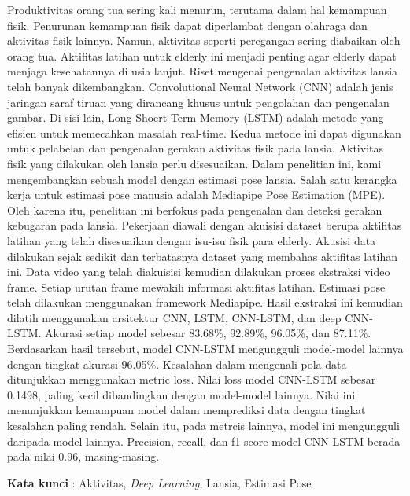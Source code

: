 \begin{spacing}{1}
    
    Produktivitas orang tua sering kali menurun, terutama dalam hal kemampuan fisik. Penurunan kemampuan fisik dapat diperlambat dengan olahraga dan aktivitas fisik lainnya. Namun, aktivitas seperti peregangan sering diabaikan oleh orang tua. Aktifitas latihan untuk elderly ini menjadi penting agar elderly dapat menjaga kesehatannya di usia lanjut. Riset mengenai pengenalan aktivitas lansia telah banyak dikembangkan. Convolutional Neural Network (CNN) adalah jenis jaringan saraf tiruan yang dirancang khusus untuk pengolahan dan pengenalan gambar. Di sisi lain, Long Shoert-Term Memory (LSTM) adalah metode yang efisien untuk memecahkan masalah real-time. Kedua metode ini dapat digunakan untuk pelabelan dan pengenalan gerakan aktivitas fisik pada lansia. Aktivitas fisik yang dilakukan oleh lansia perlu disesuaikan. Dalam penelitian ini, kami mengembangkan sebuah model dengan estimasi pose lansia. Salah satu kerangka kerja untuk estimasi pose manusia adalah Mediapipe Pose Estimation (MPE). Oleh karena itu, penelitian ini berfokus pada pengenalan dan deteksi gerakan kebugaran pada lansia. Pekerjaan diawali dengan akuisisi dataset berupa aktifitas latihan yang telah disesuaikan dengan isu-isu fisik para elderly. Akusisi data dilakukan sejak sedikit dan terbatasnya dataset yang membahas aktifitas latihan ini. Data video yang telah diakuisisi kemudian dilakukan proses ekstraksi video frame. Setiap urutan frame mewakili informasi aktifitas latihan. Estimasi pose telah dilakukan menggunakan framework Mediapipe. Hasil ekstraksi ini kemudian dilatih menggunakan arsitektur CNN, LSTM, CNN-LSTM, dan deep CNN-LSTM. Akurasi setiap model sebesar 83.68\%, 92.89\%, 96.05\%, dan 87.11\%. Berdasarkan hasil tersebut, model CNN-LSTM mengungguli model-model lainnya dengan tingkat akurasi 96.05\%. Kesalahan dalam mengenali pola data ditunjukkan menggunakan metric loss. Nilai loss model CNN-LSTM sebesar 0.1498, paling kecil dibandingkan dengan model-model lainnya. Nilai ini menunjukkan kemampuan model dalam memprediksi data dengan tingkat kesalahan paling rendah. Selain itu, pada metrcis lainnya, model ini mengungguli daripada model lainnya. Precision, recall, dan f1-score model CNN-LSTM berada pada nilai 0.96, masing-masing.

    \vspace{2ex}
    \textbf{Kata kunci }: Aktivitas, \textit{Deep Learning}, Lansia, Estimasi Pose

\end{spacing}